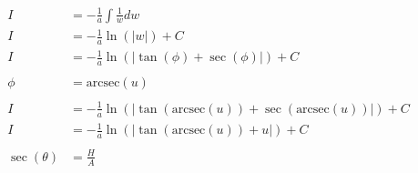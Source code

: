 \documentclass[12pt]{article}
\begin{document}
\begin{align}
    I                                                      & = -\frac{1}{a} \int \frac{1}{w} dw                                                                                                                            \\
    I                                                      & = -\frac{1}{a} \ln(|w|) + C                                                                                                                                   \\
    I                                                      & = -\frac{1}{a} \ln(|\tan(\phi)+\sec(\phi)|) + C                                                                                                               \\
    \nonumber                                                                                                                                                                                                              \\
    \phi                                                   & = \text{arcsec}(u)                                                                                                                                            \\
    \nonumber                                                                                                                                                                                                              \\
    I                                                      & = -\frac{1}{a} \ln(|\tan(\text{arcsec}(u))+\sec(\text{arcsec}(u))|) + C                                                                                       \\
    I                                                      & = -\frac{1}{a} \ln(|\tan(\text{arcsec}(u))+u|) + C                                                                                                            \\
    \nonumber                                                                                                                                                                                                              \\
    \sec(\theta)                                           & = \frac{H}{A}                                                                                                                                                 \\

\end{align}
\end{document}
